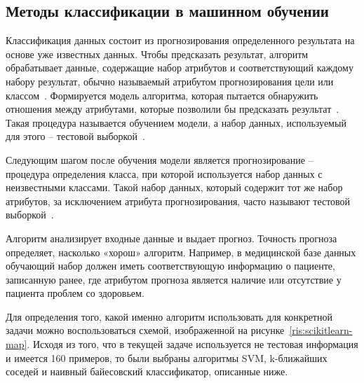 \subsection{Методы классификации в машинном обучении}
Классификация данных состоит из прогнозирования определенного результата на основе уже известных данных. Чтобы предсказать результат, алгоритм обрабатывает данные, содержащие набор атрибутов и соответствующий каждому набору результат, обычно называемый атрибутом прогнозирования цели или классом~\cite{hetal2016}. Формируется модель алгоритма, которая пытается обнаружить отношения между атрибутами, которые позволили бы предсказать результат~\cite{kumbhar}. Такая процедура называется обучением модели, а набор данных, используемый для этого -- тестовой выборкой~\cite{Mirmozaffari}.
\par
Следующим шагом после обучения модели является прогнозирование -- процедура определения класса, при которой используется набор данных с неизвестными классами. Такой набор данных, который содержит тот же набор атрибутов, за исключением атрибута прогнозирования, часто называют тестовой выборкой~\cite{tprogeralgorithms}.
\par
Алгоритм анализирует входные данные и выдает прогноз. Точность прогноза определяет, насколько «хорош» алгоритм. Например, в медицинской базе данных обучающий набор должен иметь соответствующую информацию о пациенте, записанную ранее, где атрибутом прогноза является наличие или отсутствие у пациента проблем со здоровьем.
\par
Для определения того, какой именно алгоритм использовать для конкретной задачи можно воспользоваться схемой, изображенной на рисунке~\ref{ris:scikitlearn-map}. Исходя из того, что в текущей задаче используется не тестовая информация и имеется 160 примеров, то были выбраны алгоритмы SVM, k-ближайших соседей и наивный байесовский классификатор, описанные ниже.
\\
